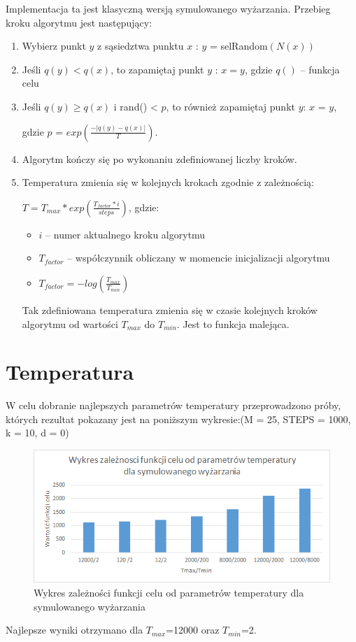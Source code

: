 \documentclass[a4paper]{article}
\begin{document}
Implementacja ta jest klasyczną wersją symulowanego wyżarzania. Przebieg kroku algorytmu jest następujący:
\begin{enumerate}
\item Wybierz punkt $y$ z sąsiedztwa punktu $x$ : $y$ = selRandom$(N(x))$
\item Jeśli $q(y) < q(x)$, to zapamiętaj punkt $y$ : $x = y$, gdzie $q()$ – funkcja celu
\item Jeśli $q(y) \ge q(x)$ i rand() < $p$, to również zapamiętaj punkt $y$: $x$ = $y$, 

gdzie $p$ = $exp\left(\frac{- |q(y)-q(x)|}{T}\right)$.
\item Algorytm kończy się po wykonaniu zdefiniowanej liczby kroków.
\item Temperatura zmienia się w kolejnych krokach zgodnie z zależnością:

$T = T_{max} * exp\left(\frac{T_{factor} * i }{steps}\right)$, gdzie:
\begin{itemize}
\item  $i$ – numer aktualnego kroku algorytmu
\item $T_{factor}$ – współczynnik obliczany w momencie inicjalizacji algorytmu
\item $T_{factor} = -log\left(\frac{T_{max}}{T_{min}}\right)$
\end{itemize}
Tak zdefiniowana temperatura zmienia się w czasie kolejnych kroków algorytmu od wartości $T_{max}$ do $T_{min}$. Jest to funkcja malejąca.
\end{enumerate}

\section{Temperatura}

W celu dobranie najlepszych parametrów temperatury przeprowadzono próby, których rezultat pokazany jest na poniższym wykresie:(M = 25, STEPS = 1000, k = 10, d = 0)
\begin{figure}[h]
\centering
\includegraphics[width=12cm]{temp}
\caption{Wykres zależności funkcji celu od parametrów temperatury dla symulowanego wyżarzania}
\end{figure}\newline
Najlepsze wyniki otrzymano dla $T_{max}$=12000 oraz $T_{min}$=2.
\end{document}
